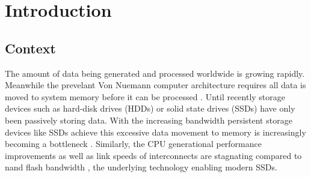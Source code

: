 

\chapter{Introduction}

\ifpdf
    \graphicspath{{1_introduction/figures/PNG/}{1_introduction/figures/PDF/}{1_introduction/figures/}}
\else
    \graphicspath{{1_introduction/figures/EPS/}{1_introduction/figures/}}
\fi







\section{Context} 



The amount of data being generated and processed worldwide is growing rapidly.
Meanwhile the prevelant Von Nuemann computer architecture requires all data is 
moved to system memory before it can be processed \cite{2018-neumann-bottleneck}.
Until recently storage devices such as hard-disk drives (HDDs) or solid state
drives (SSDs) have only been passively storing data. With the increasing
bandwidth persistent storage devices like SSDs achieve this excessive data
movement to memory is increasingly becoming a bottleneck \cite{2014-micro-ndp}.
Similarly, the CPU generational performance
improvements \cite{2016-western-digital} as well as link speeds of interconnects
are stagnating compared to nand flash bandwidth \cite{10.1145/3286588}, the
underlying technology enabling modern SSDs.

